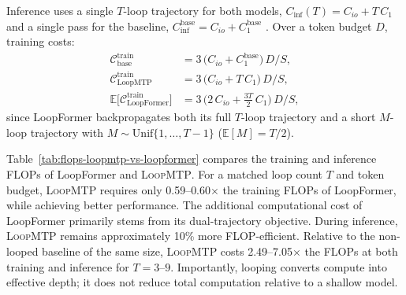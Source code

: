 Inference uses a single $T$-loop trajectory for both models,
$C_{\mathrm{inf}}(T) = C_{io} + T\,C_1$ and a single pass for the baseline,
$C_{\mathrm{inf}}^{\mathrm{base}} = C_{io} + C_1^{\mathrm{base}}$ . Over a token budget $D$, training costs:
\begin{align*}
\mathcal{C}^{\mathrm{train}}_{\mathrm{base}} &= 3\,\big(C_{io} + C_1^{\mathrm{base}}\big)\, D/S, \\[8pt]
\mathcal{C}^{\mathrm{train}}_{\mathrm{LoopMTP}} &= 3\,\big(C_{io} + T\, C_1\big)\, D/S, \\[8pt]
\mathbb{E}\big[\mathcal{C}^{\mathrm{train}}_{\mathrm{LoopFormer}}\big] &= 3\,\big(2\,C_{io} + \tfrac{3T}{2}\, C_1\big)\, D/S,
\end{align*}
since LoopFormer backpropagates both its full $T$-loop trajectory and a short
$M$-loop trajectory with $M \sim \mathrm{Unif}\{1,\dots,T-1\}$ ($\mathbb{E}[M] = T/2$).


Table~\ref{tab:flops-loopmtp-vs-loopformer} compares the training and inference FLOPs of LoopFormer and \textsc{LoopMTP}. For a matched loop count $T$ and token budget, \textsc{LoopMTP} requires only 0.59--0.60$\times$ the training FLOPs of LoopFormer, while achieving better performance. The additional computational cost of LoopFormer primarily stems from its dual-trajectory objective. During inference, \textsc{LoopMTP} remains approximately 10\% more FLOP-efficient.
Relative to the non-looped baseline of the same size, \textsc{LoopMTP} costs 2.49--7.05$\times$ the FLOPs at both training and inference for $T{=}3$--$9$. Importantly, looping converts compute into effective depth; it does not reduce total computation relative to a shallow model.

